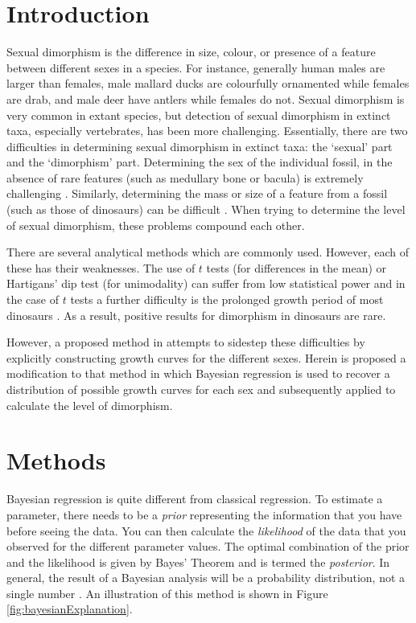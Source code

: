 \documentclass[letterpaper]{article}
\title{\actualTitle}
\author{Eric Campbell \\ \texttt{eric.robert.campbell@gmail.com}}
\date{}
\begin{document}
\maketitle


\section{Introduction}
Sexual dimorphism is the difference in size, colour, or presence of a feature between different sexes in a species. For instance, generally human males are larger than females, male mallard ducks are colourfully ornamented while females are drab, and male deer have antlers while females do not. Sexual dimorphism is very common in extant species, but detection of sexual dimorphism in extinct taxa, especially vertebrates, has been more challenging. Essentially, there are two difficulties in determining sexual dimorphism in extinct taxa: the `sexual' part and the `dimorphism' part. Determining the sex of the individual fossil, in the absence of rare features (such as medullary bone or bacula) is extremely challenging \parencite{saittaEffectSizeStatistical2020}. Similarly, determining the mass or size of a feature from a fossil (such as those of dinosaurs) can be difficult \parencite[p.~126]{brusatte2012}. When trying to determine the level of sexual dimorphism, these problems compound each other.

There are several analytical methods which are commonly used. However, each of these has their weaknesses. The use of $t$ tests (for differences in the mean) or Hartigans' dip test (for unimodality) can suffer from low statistical power \parencite{mallonRecognizingSexualDimorphism2017} and in the case of $t$ tests a further difficulty is the prolonged growth period of most dinosaurs \parencite{honeProtractedGrowthImpedes2017}. As a result, positive results for dimorphism in dinosaurs are rare.

However, a proposed method in \cite{saittaEffectSizeStatistical2020} attempts to sidestep these difficulties by explicitly constructing growth curves for the different sexes. Herein is proposed a modification to that method in which Bayesian regression is used to recover a distribution of possible growth curves for each sex and subsequently applied to calculate the level of dimorphism.


\section{Methods}
Bayesian regression is quite different from classical regression. To estimate a parameter, there needs to be a \emph{prior} representing the information that you have before seeing the data. You can then calculate the \emph{likelihood} of the data that you observed for the different parameter values. The optimal combination of the prior and the likelihood is given by Bayes' Theorem and is termed the \emph{posterior}. In general, the result of a Bayesian analysis will be a probability distribution, not a single number \parencite{mcelreathStatisticalRethinkingBayesian2020}. An illustration of this method is shown in Figure \ref{fig:bayesianExplanation}.
\end{document}
